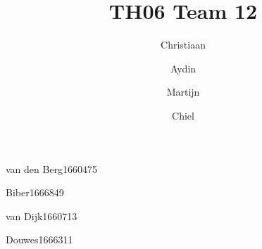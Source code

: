 \title{TH06 Team 12}

\author{Christiaan}{van den Berg}{1660475}
\author{Aydin}{Biber}{1666849}
\author{Martijn}{van Dijk}{1660713}
\author{Chiel}{Douwes}{1666311}

